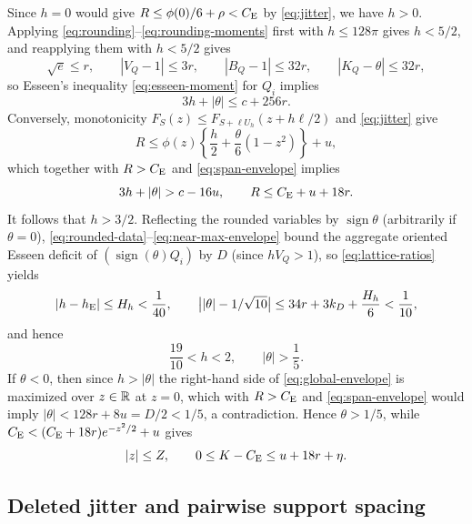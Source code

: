 Since $h=0$ would give $R\le\phi(0)/6+\rho<C_{\mathrm E}$ by \eqref{eq:jitter}, we have
$h>0$. Applying \eqref{eq:rounding}--\eqref{eq:rounding-moments} first with
$h\le128\pi$ gives $h<5/2$, and reapplying them with $h<5/2$ gives
\begin{equation}\label{eq:rounded-data}
 \sqrt e\le r,\qquad|V_Q-1|\le3r,\qquad
 |B_Q-1|\le32r,\qquad|K_Q-\theta|\le32r,
\end{equation}
so Esseen's inequality \eqref{eq:esseen-moment} for $Q_i$ implies
\begin{equation}\label{eq:span-envelope}
                3h+|\theta|\le c+256r.
\end{equation}
Conversely, monotonicity $F_S(z)\le F_{S+\ell U_h}(z+h\ell/2)$ and
\eqref{eq:jitter} give
\begin{equation}\label{eq:global-envelope}
 R\le\phi(z)\left\{\frac h2+\frac\theta6(1-z^2)\right\}+u,
\end{equation}
which together with $R>C_{\mathrm E}$ and \eqref{eq:span-envelope} implies
\begin{equation}\label{eq:near-max-envelope}
 3h+|\theta|>c-16u,\qquad R\le\be+u+18r.
\end{equation}
It follows that $h>3/2$. Reflecting the rounded variables by
$\operatorname{sign}\theta$ (arbitrarily if $\theta=0$),
\eqref{eq:rounded-data}--\eqref{eq:near-max-envelope} bound the aggregate
oriented Esseen deficit of $(\operatorname{sign}(\theta)Q_i)$ by $D$ (since
$hV_Q>1$), so \eqref{eq:lattice-ratios} yields
\begin{equation}\label{eq:near-esseen}
 |h-h_{\mathrm E}|\le H_h<\frac1{40},\qquad
 \bigl||\theta|-1/\sqrt{10}\bigr|\le34r+3k_D+\frac{H_h}{6}<\frac1{10},
\end{equation}
and hence
\begin{equation}\label{eq:span-range}
                  \frac{19}{10}<h<2,\qquad|\theta|>\frac15.
\end{equation}
If $\theta<0$, then since $h>|\theta|$ the right-hand side of
\eqref{eq:global-envelope} is maximized over $z\in\mathbb R$ at $z=0$, which with
$R>C_{\mathrm E}$ and \eqref{eq:span-envelope} would imply $|\theta|<128r+8u=D/2<1/5$, a
contradiction. Hence $\theta>1/5$, while $C_{\mathrm E}<(C_{\mathrm E}+18r)e^{-z^2/2}+u$ gives
\begin{equation}\label{eq:threshold-bound}
           |z|\le Z,\qquad0\le K-C_{\mathrm E}\le u+18r+\eta.
\end{equation}

\subsection{Deleted jitter and pairwise support spacing}

